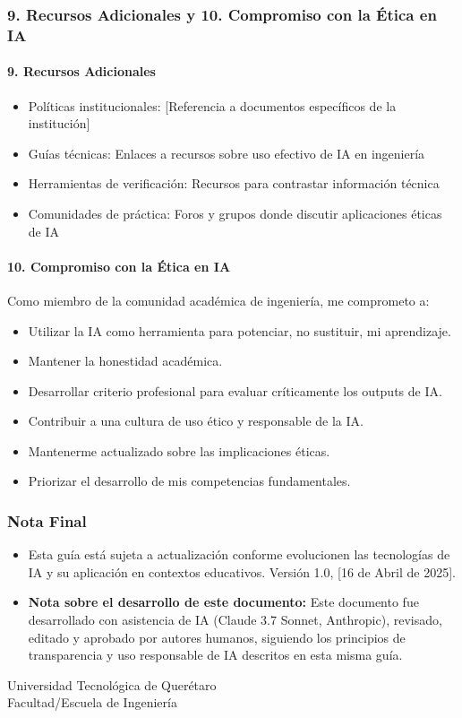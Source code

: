 \documentclass{beamer}
\begin{document}
	\begin{frame}
		\frametitle{9. Recursos Adicionales y 10. Compromiso con la Ética en IA}
		\framesubtitle{9. Recursos Adicionales}
		\begin{itemize}
			\item Políticas institucionales: [Referencia a documentos específicos de la institución]
			\item Guías técnicas: Enlaces a recursos sobre uso efectivo de IA en ingeniería
			\item Herramientas de verificación: Recursos para contrastar información técnica
			\item Comunidades de práctica: Foros y grupos donde discutir aplicaciones éticas de IA
		\end{itemize}
		\pause
		\framesubtitle{10. Compromiso con la Ética en IA}
		Como miembro de la comunidad académica de ingeniería, me comprometo a:
		\begin{itemize}
			\item Utilizar la IA como herramienta para potenciar, no sustituir, mi aprendizaje.
			\item Mantener la honestidad académica.
			\item Desarrollar criterio profesional para evaluar críticamente los outputs de IA.
			\item Contribuir a una cultura de uso ético y responsable de la IA.
			\item Mantenerme actualizado sobre las implicaciones éticas.
			\item Priorizar el desarrollo de mis competencias fundamentales.
		\end{itemize}
	\end{frame}
	
	\begin{frame}
		\frametitle{Nota Final}
		\begin{itemize}
			\item Esta guía está sujeta a actualización conforme evolucionen las tecnologías de IA y su aplicación en contextos educativos. Versión 1.0, [16 de Abril de 2025].
			\item \textbf{Nota sobre el desarrollo de este documento:} Este documento fue desarrollado con asistencia de IA (Claude 3.7 Sonnet, Anthropic), revisado, editado y aprobado por autores humanos, siguiendo los principios de transparencia y uso responsable de IA descritos en esta misma guía.
		\end{itemize}
		\vfill
		\centering
		Universidad Tecnológica de Querétaro \\ Facultad/Escuela de Ingeniería
	\end{frame}
	
\end{document}
